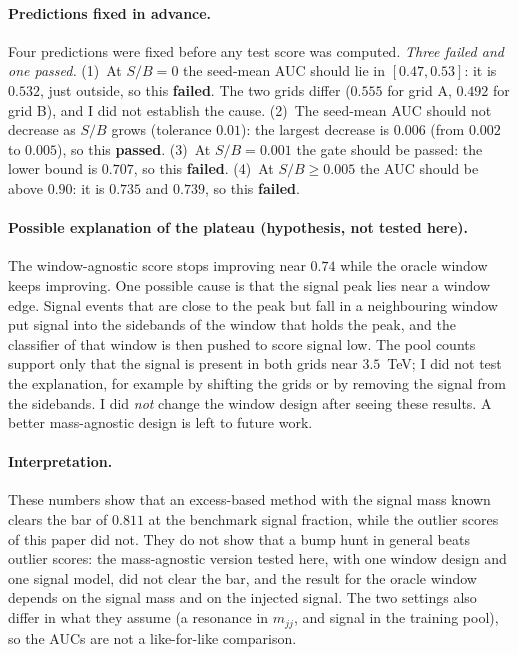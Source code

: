 \documentclass[11pt,a4paper]{article}
\newcommand{\mjj}{\ensuremath{m_{jj}}\xspace}
\begin{document}
\paragraph{Predictions fixed in advance.}
Four predictions were fixed before any test score was computed. \emph{Three failed and one passed.}
(1)~At $S/B=0$ the seed-mean AUC should lie in $[0.47,0.53]$: it is $0.532$, just outside, so this
\textbf{failed}. The two grids differ ($0.555$ for grid A, $0.492$ for grid B), and I did not establish
the cause. (2)~The seed-mean AUC should not decrease as $S/B$ grows (tolerance $0.01$): the largest
decrease is $0.006$ (from $0.002$ to $0.005$), so this \textbf{passed}. (3)~At $S/B=0.001$ the gate should be passed:
the lower bound is $0.707$, so this \textbf{failed}. (4)~At $S/B\geq0.005$ the AUC should be above $0.90$:
it is $0.735$ and $0.739$, so this \textbf{failed}.

\paragraph{Possible explanation of the plateau (hypothesis, not tested here).}
The window-agnostic score stops improving near $0.74$ while the oracle window keeps improving. One possible
cause is that the signal peak lies near a window edge. Signal events that are close to the peak but fall
in a neighbouring window put signal into the sidebands of the window that holds the peak, and
the classifier of that window is then pushed to score signal low. The pool counts support only that
the signal is present in both grids near $3.5$~TeV; I did not test the explanation, for example by
shifting the grids or by removing the signal from the sidebands. I did \emph{not} change the window design
after seeing these results. A better mass-agnostic design is left to future work.

\paragraph{Interpretation.}
These numbers show that an excess-based method with the signal mass known clears the bar of $0.811$ at the
benchmark signal fraction, while the outlier scores of this paper did not. They do not show that a
bump hunt in general beats outlier scores: the mass-agnostic version tested here, with one window design
and one signal model, did not clear the bar, and the result for the oracle window depends on the
signal mass and on the injected signal. The two settings also differ in what they assume (a resonance in \mjj,
and signal in the training pool), so the AUCs are not a like-for-like comparison.
\end{document}
